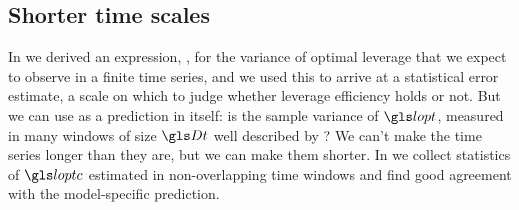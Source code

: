 \subsection{Shorter time scales}
In  we derived an expression, , for the variance of optimal leverage that we expect to observe in a finite time series, and we used this to arrive at a statistical error estimate, a scale on which to judge whether leverage efficiency holds or not.
But we can use  as a prediction in itself: is the sample variance of $\lopt$, measured in many windows of size $\Dt$ well described by ? We can't make the time series longer than they are, but we can make them shorter. In  we collect statistics of $\loptc$ estimated in non-overlapping time windows and find good agreement with the model-specific prediction. 
%
